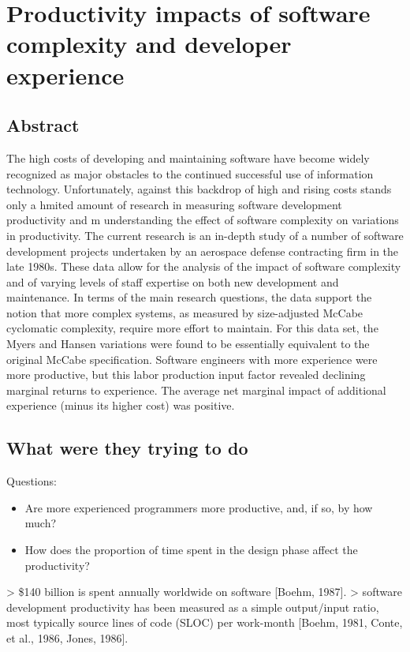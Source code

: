 \section{Productivity impacts of software complexity and developer experience}

\subsection{Abstract}

The high costs of developing and maintaining software have become widely recognized as major
obstacles to the continued successful use of information technology. Unfortunately, against this backdrop
of high and rising costs stands only a hmited amount of research in measuring software development
productivity and m understanding the effect of software complexity on variations in productivity. The
current research is an in-depth study of a number of software development projects undertaken by an
aerospace defense contracting firm in the late 1980s. These data allow for the analysis of the impact
of software complexity and of varying levels of staff expertise on both new development and
maintenance.
In terms of the main research questions, the data support the notion that more complex
systems, as measured by size-adjusted McCabe cyclomatic complexity, require more effort to maintain.
For this data set, the Myers and Hansen variations were found to be essentially equivalent to the
original McCabe specification. Software engineers with more experience were more productive, but this labor production input factor revealed declining marginal returns to experience. The average net marginal impact of additional experience (minus its higher cost) was positive.

\subsection{What were they trying to do}

Questions:

\begin{itemize}
    \item Are more experienced programmers more productive, and, if so, by how much?
    \item How does the proportion of time spent in the design phase affect the productivity?
\end{itemize}

> \$140 billion is spent annually worldwide on software [Boehm, 1987].
> software development productivity has been measured as a simple output/input ratio, most typically source lines of code (SLOC) per work-month [Boehm, 1981, Conte, et al., 1986, Jones, 1986].

